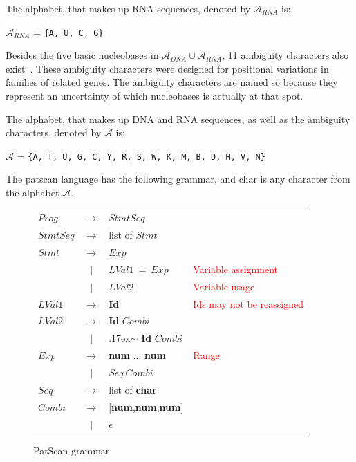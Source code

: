\documentclass[12pt]{article}
\theoremstyle{definition}
\begin{document}
\begin{definition}
The alphabet, that makes up RNA sequences, denoted by $\mathcal{A}_{RNA}$ is:
\begin{center}
$\mathcal{A}_{RNA}$ = \texttt{\{A, U, C, G\}}
\end{center}
\end{definition}

Besides the five basic nucleobases in $\mathcal{A}_{DNA} \cup \mathcal{A}_{RNA}$, 11 ambiguity characters also exist~\cite{DNA-sciencedaily}. These ambiguity characters were designed for positional variations in families of related genes. The ambiguity characters are named so because they represent  an uncertainty of which nucleobases is actually at that spot.

\begin{definition}
The alphabet, that makes up DNA and RNA sequences, as well as the ambiguity characters, denoted by $\mathcal{A}$ is:
\begin{center}
$\mathcal{A}$ = \texttt{\{A, T, U, G, C, Y, R, S, W, K, M, B, D, H, V, N\}}
\end{center}
\end{definition}

The patscan language has the following grammar, and char is any character from the alphabet $\mathcal{A}$.

\begin{figure}[H]
\begin{center}
\begin{tabular}{|lcll|}
	\hline
	$Prog$ & $\rightarrow$ & $StmtSeq$ & \\
	$StmtSeq$ & $\rightarrow$ & list of $Stmt$ & \\
	$Stmt$ & $\rightarrow$ & $Exp$ & \\
	\enspace & $|$ & $LVal1\ =\ Exp$ &  \textcolor{red}{Variable assignment} \\
	\enspace & $|$ & $LVal2$ & \textcolor{red}{Variable usage} \\
	$LVal1$ & $\rightarrow$ & \textbf{Id} & \textcolor{red}{Ids may not be reassigned}\\
	$LVal2$ & $\rightarrow$ & \textbf{Id} $Combi$ & \\
	\enspace & $|$ & {\raise.17ex\hbox{$\scriptstyle\mathtt{\sim}$}} \textbf{Id} $Combi$ & \\
	$Exp$ & $\rightarrow$ & \textbf{num} ... \textbf{num} & \textcolor{red}{Range} \\
	\enspace & $|$ & $Seq\ Combi$ & \\
	$Seq$ & $\rightarrow$ & list of \textbf{char} & \\
	$Combi$ & $\rightarrow$ & [\textbf{num},\textbf{num},\textbf{num}] & \\
	\enspace & $|$ & $\epsilon$ & \\
	\hline
\end{tabular}
\end{center}
\caption{PatScan grammar}
\end{figure}
\end{document}
